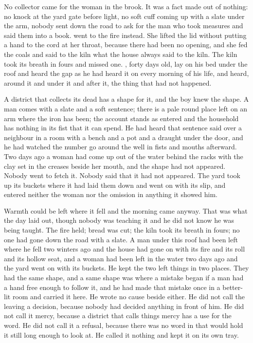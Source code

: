 
No collector came for the woman in the brook. It was a fact made out of nothing: no knock at the yard gate before light, no soft cuff coming up  with a slate under the arm, nobody sent down the road to ask for the man who took measures and said them into a book.  went to the fire instead. She lifted the lid without putting a hand to the cord at her throat, because there had been no opening, and she fed the coals and said to the kiln what the house always said to the kiln. The kiln took its breath in fours and missed one. , forty days old, lay on his bed under the  roof and heard the gap as he had heard it on every morning of his life, and heard, around it and under it and after it, the thing that had not happened.

A district that collects its dead has a shape for it, and the boy knew the shape. A man comes with a slate and a soft sentence; there is a pale round place left on an arm where the iron has been; the account stands as entered and the household has nothing in its fist that it can spend. He had heard that sentence said over a neighbour in a room with a bench and a pot and a draught under the door, and he had watched the number go around the well in fists and mouths afterward. Two days ago a woman had come up out of the water behind the racks with the clay set in the creases beside her mouth, and the shape had not appeared. Nobody went to fetch it. Nobody said that it had not appeared. The yard took up its buckets where it had laid them down and went on with its slip, and  entered neither the woman nor the omission in anything it showed him.

Warmth could be left where it fell and the morning came anyway. That was what the day laid out, though nobody was teaching it and he did not know he was being taught. The fire held; bread was cut; the kiln took its breath in fours; no one had gone down the road with a slate. A man under this roof had been left where he fell two winters ago and the house had gone on with its fire and its roll and its hollow seat, and a woman had been left in the water two days ago and the yard went on with its buckets. He kept the two left things in two places. They had the same shape, and a same shape was where a mistake began if a man had a hand free enough to follow it, and he had made that mistake once in a better-lit room and carried it here. He wrote no cause beside either. He did not call the leaving a decision, because nobody had decided anything in front of him. He did not call it mercy, because a district that calls things mercy has a use for the word. He did not call it a refusal, because there was no word in  that would hold it still long enough to look at. He called it nothing and kept it on its own tray.

